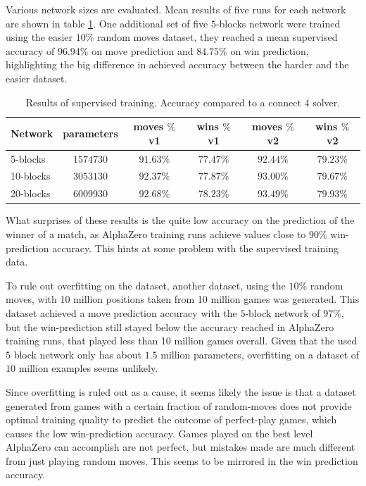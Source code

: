 \documentclass[12pt,onecolumn,oneside,titlepage]{article}
\begin{document}
Various network sizes are evaluated. Mean results of five runs for each network are shown in table \ref{t:supervised_results}. One additional set of five $5$-blocks network were trained using the easier $10\%$ random moves dataset, they reached a mean supervised accuracy
of $96.94\%$ on move prediction and $84.75\%$ on win prediction, highlighting the big difference in achieved accuracy between the harder and the easier dataset.

\begin{table} [H]
 \centering
  \begin{tabular}{ l | c c c c c }
  Network & parameters & moves $\%$ v1 & wins $\%$ v1 & moves $\%$ v2 & wins $\%$ v2 \\
  \hline
  5-blocks & $1574730$ & $91.63\%$ & $77.47\%$ & $92.44\%$ & $79.23\%$ \\
  10-blocks & $3053130$ & $92.37\%$ & $77.87\%$ & $93.00\%$ & $79.67\%$ \\
  20-blocks & $6009930$ & $92.68\%$ & $78.23\%$ & $93.49\%$ & $79.93\%$ \\
  \end{tabular}
  \caption{Results of supervised training. Accuracy compared to a connect 4 solver.}
  \label{t:supervised_results}
\end{table}


What surprises of these results is the quite low accuracy on the prediction of the winner of a match, as AlphaZero training runs achieve values close to $90\%$ win-prediction accuracy.
This hints at some problem with the supervised training data.

To rule out overfitting on the dataset, another dataset, using the $10\%$ random moves, with 10 million positions taken from 10 million games was generated. This dataset achieved a move prediction accuracy with the $5$-block network 
of $97\%$, but the win-prediction still stayed below the accuracy reached in AlphaZero training runs, that played less than 10 million games overall.
Given that the used $5$ block network only has about $1.5$ million parameters, overfitting on a dataset of $10$ million examples seems unlikely.

Since overfitting is ruled out as a cause, it seems likely the issue is that a dataset generated from games with a certain fraction of random-moves does not provide optimal training quality to predict the outcome of perfect-play games, which causes the low win-prediction accuracy.
Games played on the best level AlphaZero can accomplish are not perfect, but mistakes made are much different from just playing random moves. This seems to be mirrored in the win prediction accuracy.
\end{document}

